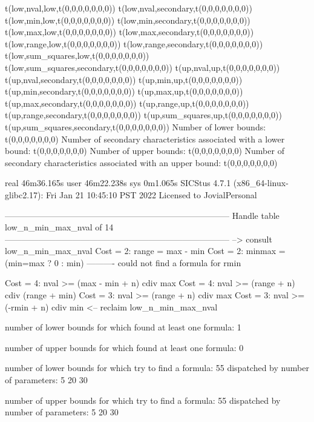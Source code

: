 t(low,nval,low,t(0,0,0,0,0,0,0))
t(low,nval,secondary,t(0,0,0,0,0,0,0))
t(low,min,low,t(0,0,0,0,0,0,0))
t(low,min,secondary,t(0,0,0,0,0,0,0))
t(low,max,low,t(0,0,0,0,0,0,0))
t(low,max,secondary,t(0,0,0,0,0,0,0))
t(low,range,low,t(0,0,0,0,0,0,0))
t(low,range,secondary,t(0,0,0,0,0,0,0))
t(low,sum_squares,low,t(0,0,0,0,0,0,0))
t(low,sum_squares,secondary,t(0,0,0,0,0,0,0))
t(up,nval,up,t(0,0,0,0,0,0,0))
t(up,nval,secondary,t(0,0,0,0,0,0,0))
t(up,min,up,t(0,0,0,0,0,0,0))
t(up,min,secondary,t(0,0,0,0,0,0,0))
t(up,max,up,t(0,0,0,0,0,0,0))
t(up,max,secondary,t(0,0,0,0,0,0,0))
t(up,range,up,t(0,0,0,0,0,0,0))
t(up,range,secondary,t(0,0,0,0,0,0,0))
t(up,sum_squares,up,t(0,0,0,0,0,0,0))
t(up,sum_squares,secondary,t(0,0,0,0,0,0,0))
Number of lower bounds:                                             t(0,0,0,0,0,0,0)
Number of secondary characteristics associated with a lower bound:  t(0,0,0,0,0,0,0)
Number of upper bounds:                                             t(0,0,0,0,0,0,0)
Number of secondary characteristics associated with an upper bound: t(0,0,0,0,0,0,0)

real	46m36.165s
user	46m22.238s
sys	0m1.065s
SICStus 4.7.1 (x86_64-linux-glibc2.17): Fri Jan 21 10:45:10 PST 2022
Licensed to JovialPersonal


--------------------------------------------------------------------------------
Handle table low_n_min_max_nval of 14
--------------------------------------------------------------------------------
--> consult low_n_min_max_nval
Cost =  2:  range  = max - min
Cost =  2:  minmax = (min=max ? 0 : min)
----------
could not find a formula for rmin

Cost =  4:  nval >= (max - min + n) cdiv max
Cost =  4:  nval >= (range + n) cdiv (range + min)
Cost =  3:  nval >= (range + n) cdiv max
Cost =  3:  nval >= (-rmin + n) cdiv min
<-- reclaim low_n_min_max_nval

number of lower bounds for which found at least one formula: 1

number of upper bounds for which found at least one formula: 0

number of lower bounds for which try to find a formula: 55
dispatched by number of parameters: 5  20  30

number of upper bounds for which try to find a formula: 55
dispatched by number of parameters: 5  20  30

